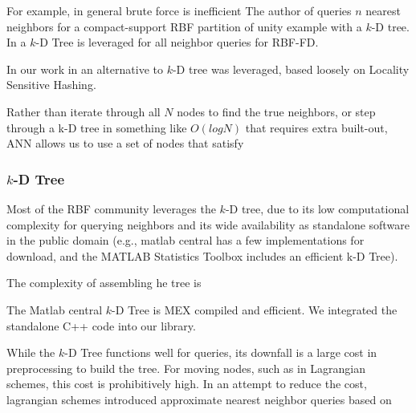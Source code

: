 \documentclass[11pt]{report}
\begin{document}
{%



For example, in general brute force is inefficient 
The author of \cite{Fasshauer2007} queries $n$ nearest neighbors for a compact-support RBF partition of unity example with a $k$-D tree. In \cite{FlyerLehto11,FornbergLehto11} a $k$-D Tree is leveraged for all neighbor queries for RBF-FD. 

In our work in \cite{BolligFlyerErlebacher2012} an alternative to $k$-D tree was leveraged, based loosely on Locality Sensitive Hashing. 

Rather than iterate through all $N$ nodes to find the true neighbors, or step through a k-D tree in something like $O(log N)$ that requires extra built-out, ANN allows us to use a set of nodes that satisfy

\subsubsection{$k$-D Tree}

Most of the RBF community leverages the $k$-D tree, due to its low computational complexity for querying neighbors and its wide availability as standalone software in the public domain (e.g., matlab central has a few implementations for download, and the MATLAB Statistics Toolbox includes an efficient k-D Tree). 

The complexity of assembling he tree is

The Matlab central $k$-D Tree is MEX compiled and efficient. We integrated the standalone C++ code into our library.  

While the $k$-D Tree functions well for queries, its downfall is a large cost in preprocessing to build the tree. For moving nodes, such as in Lagrangian schemes, this cost is prohibitively high. In an attempt to reduce the cost, lagrangian schemes introduced approximate nearest neighbor queries based on 

}
\end{document}
